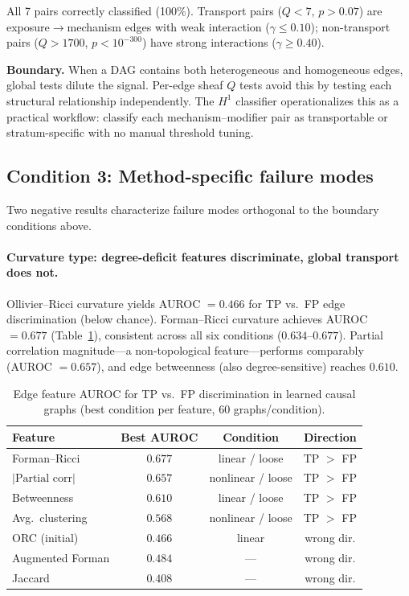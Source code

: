 \documentclass{article}
\begin{document}
All 7 pairs correctly classified (100\%).
Transport pairs ($Q < 7$, $p > 0.07$) are exposure$\to$mechanism edges with weak interaction ($\gamma \leq 0.10$); non-transport pairs ($Q > 1700$, $p < 10^{-300}$) have strong interactions ($\gamma \geq 0.40$).

\textbf{Boundary.} When a DAG contains both heterogeneous and homogeneous edges, global tests dilute the signal.
Per-edge sheaf $Q$ tests avoid this by testing each structural relationship independently.
The $H^1$ classifier operationalizes this as a practical workflow: classify each mechanism--modifier pair as transportable or stratum-specific with no manual threshold tuning.

\subsection{Condition 3: Method-specific failure modes}
\label{sec:res-failures}

Two negative results characterize failure modes orthogonal to the boundary conditions above.

\paragraph{Curvature type: degree-deficit features discriminate, global transport does not.}
Ollivier--Ricci curvature yields AUROC $= 0.466$ for TP vs.\ FP edge discrimination (below chance).
Forman--Ricci curvature achieves AUROC $= 0.677$ (Table~\ref{tab:curvature}), consistent across all six conditions ($0.634$--$0.677$).
Partial correlation magnitude---a non-topological feature---performs comparably (AUROC $= 0.657$), and edge betweenness (also degree-sensitive) reaches $0.610$.

\begin{table}[t]
\centering
\caption{Edge feature AUROC for TP vs.\ FP discrimination in learned causal graphs (best condition per feature, 60 graphs/condition).}
\label{tab:curvature}
\small
\begin{tabular}{@{}lccc@{}}
\toprule
\textbf{Feature} & \textbf{Best AUROC} & \textbf{Condition} & \textbf{Direction} \\
\midrule
Forman--Ricci & $\mathbf{0.677}$ & linear / loose & TP $>$ FP \\
$|\text{Partial corr}|$ & $0.657$ & nonlinear / loose & TP $>$ FP \\
Betweenness & $0.610$ & linear / loose & TP $>$ FP \\
Avg.\ clustering & $0.568$ & nonlinear / loose & TP $>$ FP \\
\midrule
ORC (initial) & $0.466$ & linear & wrong dir. \\
Augmented Forman & $0.484$ & --- & wrong dir. \\
Jaccard & $0.408$ & --- & wrong dir. \\
\bottomrule
\end{tabular}
\end{table}
\end{document}
